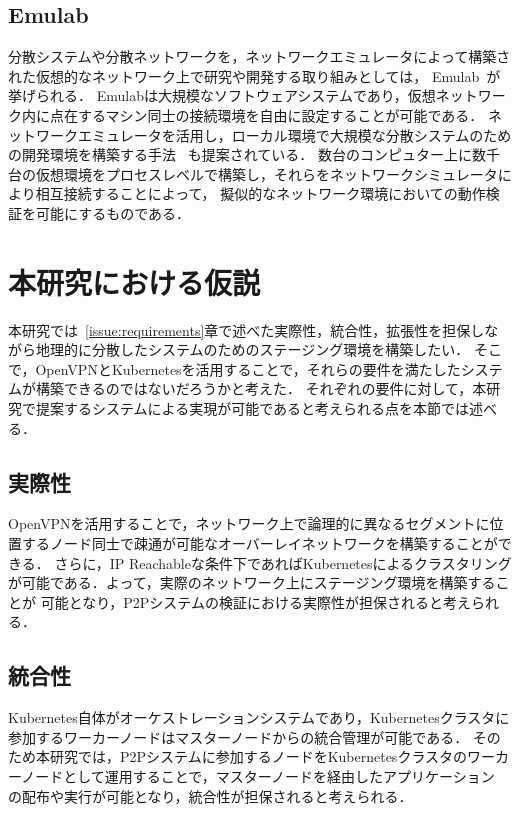 \subsection{Emulab}
\label{consideration:related-works:emulab}

分散システムや分散ネットワークを，ネットワークエミュレータによって構築された仮想的なネットワーク上で研究や開発する取り組みとしては，
Emulab~\cite{Emulab}が挙げられる．
Emulabは大規模なソフトウェアシステムであり，仮想ネットワーク内に点在するマシン同士の接続環境を自由に設定することが可能である．
ネットワークエミュレータを活用し，ローカル環境で大規模な分散システムのための開発環境を構築する手法
~\cite{RelatedWork1}も提案されている．
数台のコンピュター上に数千台の仮想環境をプロセスレベルで構築し，それらをネットワークシミュレータにより相互接続することによって，
擬似的なネットワーク環境においての動作検証を可能にするものである．

\section{本研究における仮説}
\label{issue:hypothesis}
本研究では~\ref{issue:requirements}章で述べた実際性，統合性，拡張性を担保しながら地理的に分散したシステムのためのステージング環境を構築したい．
そこで，OpenVPNとKubernetesを活用することで，それらの要件を満たしたシステムが構築できるのではないだろうかと考えた．
それぞれの要件に対して，本研究で提案するシステムによる実現が可能であると考えられる点を本節では述べる．

\subsection{実際性}
OpenVPNを活用することで，ネットワーク上で論理的に異なるセグメントに位置するノード同士で疎通が可能なオーバーレイネットワークを構築することができる．
さらに，IP Reachableな条件下であればKubernetesによるクラスタリングが可能である．よって，実際のネットワーク上にステージング環境を構築することが
可能となり，P2Pシステムの検証における実際性が担保されると考えられる．

\subsection{統合性}
Kubernetes自体がオーケストレーションシステムであり，Kubernetesクラスタに参加するワーカーノードはマスターノードからの統合管理が可能である．
そのため本研究では，P2Pシステムに参加するノードをKubernetesクラスタのワーカーノードとして運用することで，マスターノードを経由したアプリケーション
の配布や実行が可能となり，統合性が担保されると考えられる．


